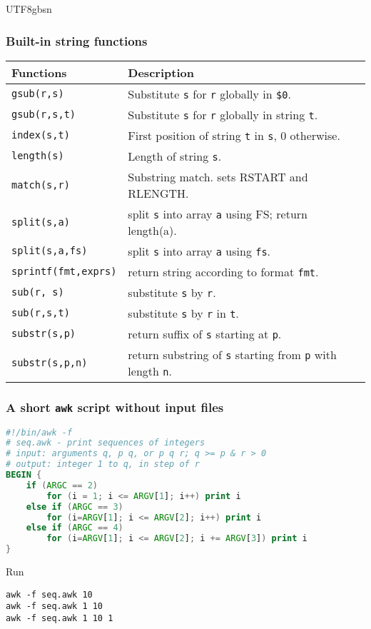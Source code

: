 \documentclass[red]{beamer}
\newcommand*{\lstverb}{\lstinline[style=caret]}
\begin{document}
\begin{CJK*}{UTF8}{gbsn}
\begin{frame}
\frametitle{Built-in string functions}
\begin{table}[ht]
\scriptsize
\renewcommand\arraystretch{1.6}
\begin{tabular}{ll}
\hline
\textbf{Functions} & \textbf{Description}\\
\hline
\lstverb|gsub(r,s)| & Substitute \texttt{s} for \texttt{r} globally in \texttt{\$0}.\\
\lstverb|gsub(r,s,t)| & Substitute \texttt{s} for \texttt{r} globally in string \texttt{t}.\\
\lstverb|index(s,t)| & First position of string \texttt{t} in \texttt{s}, 0 otherwise.\\
\lstverb|length(s)| & Length of string \texttt{s}.\\
\lstverb|match(s,r)| & Substring match. sets RSTART and RLENGTH.\\
\lstverb|split(s,a)| & split \texttt{s} into array \texttt{a} using FS; return length(a).\\
\lstverb|split(s,a,fs)| & split \texttt{s} into array \texttt{a} using \texttt{fs}.\\
\lstverb|sprintf(fmt,exprs)| & return string according to format \texttt{fmt}.\\
\lstverb|sub(r, s)| & substitute \texttt{s} by \texttt{r}.\\
\lstverb|sub(r,s,t)| & substitute \texttt{s} by \texttt{r} in \texttt{t}.\\
\lstverb|substr(s,p)| & return suffix of \texttt{s} starting at \texttt{p}.\\
\lstverb|substr(s,p,n)| & return substring of \texttt{s} starting from \texttt{p} with length \texttt{n}.\\  
\hline
\end{tabular}
\end{table}
\end{frame}


\begin{frame}
\frametitle{A short \texttt{awk} script without input files}
\begin{lstlisting}[language=awk, format=awk]
#!/bin/awk -f
# seq.awk - print sequences of integers
# input: arguments q, p q, or p q r; q >= p & r > 0
# output: integer 1 to q, in step of r
BEGIN {
	if (ARGC == 2)
		for (i = 1; i <= ARGV[1]; i++) print i
	else if (ARGC == 3)
		for (i=ARGV[1]; i <= ARGV[2]; i++) print i
	else if (ARGC == 4)
		for (i=ARGV[1]; i <= ARGV[2]; i += ARGV[3]) print i
}
\end{lstlisting}
\begin{block}{\centering\footnotesize Run}
\begin{lstlisting}
awk -f seq.awk 10
awk -f seq.awk 1 10
awk -f seq.awk 1 10 1
\end{lstlisting}
\end{block}
\end{frame}


\end{CJK*}
\end{document}
